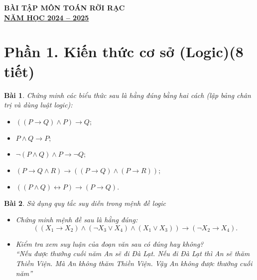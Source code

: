 \documentclass[11pt, oneside,openright,a4paper]{book}
\newtheorem{bt}{Bài }[section]
\begin{document}
\large
%
\newpage

\setcounter{page}{1}
\pagestyle{fancy}
\fancyhf{}
\rfoot{\thepage}
\renewcommand{\headrulewidth}{0.4pt}
\renewcommand{\footrulewidth}{0.4pt}
\hspace{0.5 cm}
\begin{center}
\textbf{BÀI TẬP MÔN TOÁN RỜI RẠC}\\

\textbf{\underline{NĂM HỌC 2024 -- 2025}}\\
\end{center}

\section[Phần 1. Kiến thức cơ sở (Logic)(8 tiết)]{ Phần 1. Kiến thức cơ sở (Logic)(8 tiết)}
\begin{bt}
Chứng minh các biểu thức sau là hằng đúng bằng hai cách (lập bảng chân trị và dùng luật logic): 
 \begin{itemize}
 \item[a)] $((P \rightarrow Q) \land P) \rightarrow Q;$ 
\item[b)] $P \land Q \rightarrow P;$ 
 \item[c)] $\lnot (P \land Q) \land P \rightarrow \lnot Q;$
 \item[d)] $(P \rightarrow Q \land R) \rightarrow ((P \rightarrow Q) \land (P \rightarrow R));$ 
\item[d)] $((P \land Q) \leftrightarrow P) \rightarrow (P \rightarrow Q).$
 \end{itemize}
\end{bt}
\begin{bt}
 Sử dụng quy tắc suy diễn trong mệnh đề logic
    \begin{itemize}
     \item[a)] Chứng minh mệnh đề sau là hằng đúng: 
           $$((X_1 \rightarrow X_2) \land (\lnot X_3 \lor X_4) \land (X_1 \lor X_3)) \rightarrow (\lnot X_2 \rightarrow X_4).$$
        \item[b)] Kiểm tra xem suy luận của đoạn văn sau có đúng hay không?\\
        ``Nếu được thưởng cuối năm An sẽ đi Đà Lạt. Nếu đi Đà Lạt thì An sẽ thăm Thiền Viện. Mà An không thăm Thiền Viện. Vậy An không được thưởng cuối năm''
    \end{itemize}
          
\end{bt}
\end{document}

